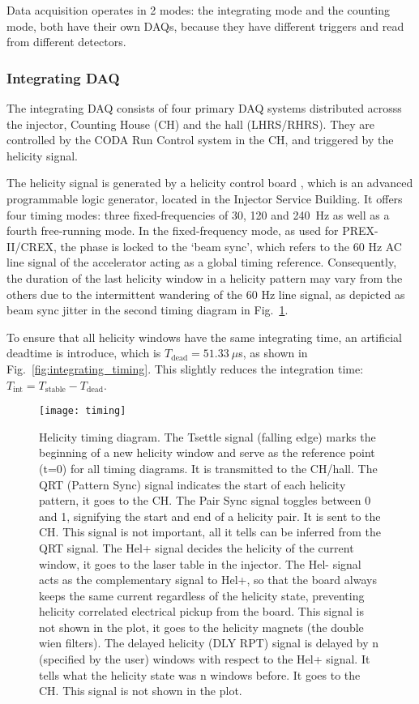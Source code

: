 Data acquisition operates in 2 modes: the integrating mode and the counting mode,
both have their own DAQs, because they have different triggers and read from
different detectors.

\subsubsection{Integrating DAQ}
The integrating DAQ consists of four primary DAQ systems distributed acrosss the injector,
Counting House (CH) and the hall (LHRS/RHRS). They are controlled by the
CODA Run Control system in the CH, and triggered by the helicity signal.

The helicity signal is generated by a helicity control board \cite{Hboard}, which 
is an advanced programmable logic generator, located in the Injector Service Building.
It offers four timing modes: three fixed-frequencies of 30, 120 and 240~Hz
as well as a fourth free-running mode. In the fixed-frequency mode, as used for PREX-II/CREX,
the phase is locked to the `beam sync', which refers to the 60 Hz AC line signal of the accelerator acting as a global timing reference. Consequently, the duration of the last helicity window in a helicity pattern may vary from the others due to the intermittent wandering of the 60 Hz line signal, as depicted as beam sync jitter in the second timing diagram in Fig.~\ref{fig:timing}.

To ensure that all helicity windows have the same integrating time, 
an artificial deadtime is introduce, which is $T_{\text{dead}} = 51.33\ \mu$s,
as shown in Fig.~\ref{fig:integrating_timing}.
This slightly reduces the integration time: $T_{\text{int}} = T_{\text{stable}} - T_{\text{dead}}$.

\begin{figure}
    \centering
    \texttt{[image: timing]}
    \caption[Helicity timing diagram]
    {Helicity timing diagram. The Tsettle signal (falling edge) marks the  
    beginning of a new helicity window and serve as the reference point (t=0)
    for all timing diagrams. It is transmitted to the CH/hall.
    The QRT (Pattern Sync) signal indicates the start of each helicity pattern,
    it goes to the CH. 
    The Pair Sync signal toggles between 0 and 1, signifying the start and end
    of a helicity pair. It is sent to the CH. This signal is not important, all it
    tells can be inferred from the QRT signal.
    The Hel+ signal decides the helicity of the current window, it goes to the 
    laser table in the injector.
    The Hel- signal acts as the complementary signal to Hel+, so that the board always 
    keeps the same current regardless of the helicity state, preventing helicity 
    correlated electrical pickup from the board. This signal is not shown in the
    plot, it goes to the helicity magnets (the double wien filters).
    The delayed helicity (DLY RPT) signal is delayed by n (specified by the user) 
    windows with respect to the Hel+ signal.
    It tells what the helicity state was n windows before. It goes to the CH. This
    signal is not shown in the plot.}
    \label{fig:timing}
\end{figure}

